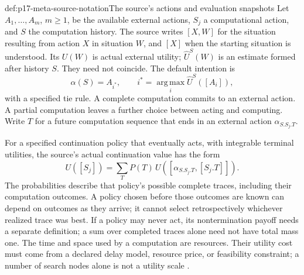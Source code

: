 \begin{hbdefinition}{def:p17-meta-source-notation}{The source's actions and evaluation snapshots}
Let \(A_1,\ldots,A_m\), \(m\geq1\), be the available external actions,
\(S_j\) a computational action, and \(S\) the computation history.
The source writes \([X,W]\) for the situation resulting from
action \(X\) in situation \(W\), and \([X]\) when the starting
situation is understood. Its \(U(W)\) is actual external utility;
\(\widehat U^S(W)\) is an estimate formed after history \(S\).
They need not coincide. The default intention is
\[
 \alpha(S)=A_{i^*},\qquad
 i^*=\operatorname*{arg\,max}_{i}\widehat U^S([A_i]),
\]
with a specified tie rule. A complete computation commits to an external
action. A partial computation leaves a further choice between acting
and computing. Write \(T\) for a future computation sequence that
ends in an external action \(\alpha_{S.S_j.T}\).

For a specified continuation policy that eventually acts, with
integrable terminal utilities, the source's actual continuation
value has the form
\[
 U([S_j])=\sum_T P(T)\,
                     U([\alpha_{S.S_j.T},[S_j.T]]).
\]
The probabilities describe that policy's possible complete traces,
including their computation outcomes. A policy chosen before those
outcomes are known can depend on outcomes as they arrive; it cannot
select retrospectively whichever realized trace was best.
If a policy may never act, its nontermination payoff needs a separate
definition; a sum over completed traces alone need not have total mass one.
The time and space used by a computation are resources. Their utility
cost must come from a declared delay model, resource price, or feasibility
constraint; a number of search nodes alone is not a utility scale
\cite[\S\S2--3, pp.~401--403]{RussellWefald1989KRMetareasoning}.
\end{hbdefinition}

